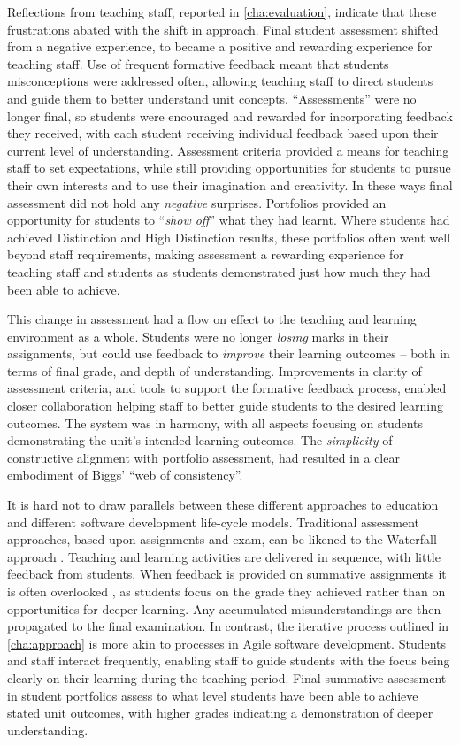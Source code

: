 Reflections from teaching staff, reported in \cref{cha:evaluation}, indicate that these frustrations abated with the shift in approach. Final student assessment shifted from a negative experience, to became a positive and rewarding experience for teaching staff. Use of frequent formative feedback meant that students misconceptions were addressed often, allowing teaching staff to direct students and guide them to better understand unit concepts. ``Assessments'' were no longer final, so students were encouraged and rewarded for incorporating feedback they received, with each student receiving individual feedback based upon their current level of understanding. Assessment criteria provided a means for teaching staff to set expectations, while still providing opportunities for students to pursue their own interests and to use their imagination and creativity. In these ways final assessment did not hold any \emph{negative} surprises. Portfolios provided an opportunity for students to ``\emph{show off}'' what they had learnt. Where students had achieved Distinction and High Distinction results, these portfolios often went well beyond staff requirements, making assessment a rewarding experience for teaching staff and students as students demonstrated just how much they had been able to achieve.

This change in assessment had a flow on effect to the teaching and learning environment as a whole. Students were no longer \emph{losing} marks in their assignments, but could use feedback to \emph{improve} their learning outcomes -- both in terms of final grade, and depth of understanding. Improvements in clarity of assessment criteria, and tools to support the formative feedback process, enabled closer collaboration helping staff to better guide students to the desired learning outcomes. The system was in harmony, with all aspects focusing on students demonstrating the unit's intended learning outcomes. The \emph{simplicity} of constructive alignment with portfolio assessment, had resulted in a clear embodiment of Biggs' ``web of consistency''.

It is hard not to draw parallels between these different approaches to education and different software development life-cycle models. Traditional assessment approaches, based upon assignments and exam, can be likened to the Waterfall approach \cite{Royce:1970}. Teaching and learning activities are delivered in sequence, with little feedback from students. When feedback is provided on summative assignments it is often overlooked \cite{Black:1998}, as students focus on the grade they achieved rather than on opportunities for deeper learning. Any accumulated misunderstandings are then propagated to the final examination. In contrast, the iterative process outlined in \cref{cha:approach} is more akin to processes in Agile software development. Students and staff interact frequently, enabling staff to guide students with the focus being clearly on their learning during the teaching period. Final summative assessment in student portfolios assess to what level students have been able to achieve stated unit outcomes, with higher grades indicating a demonstration of deeper understanding.

